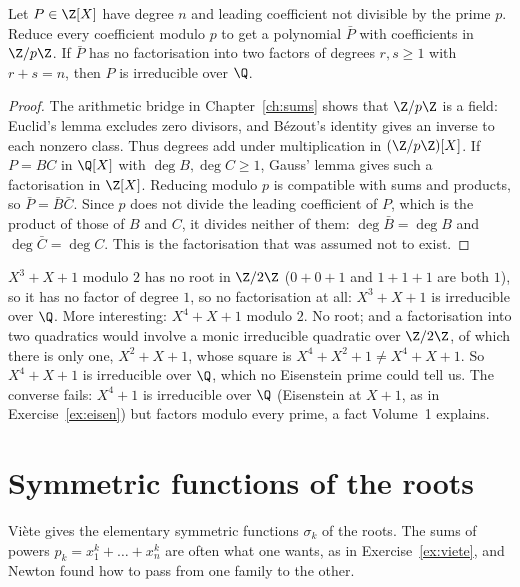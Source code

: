\begin{propositionx}
Let $P\in\Z[X]$ have degree $n$ and leading coefficient not divisible by the prime $p$. Reduce every coefficient modulo $p$ to get a polynomial
$\bar P$ with coefficients in $\Z/p\Z$. If $\bar P$ has no factorisation into two factors of degrees $r,s\ge1$ with $r+s=n$, then $P$ is
irreducible over $\Q$.
\end{propositionx}
\begin{proof}
The arithmetic bridge in Chapter~\ref{ch:sums} shows that $\Z/p\Z$ is a field: Euclid's lemma excludes zero divisors, and B\'ezout's identity gives an inverse to each nonzero class. Thus
degrees add under multiplication in $(\Z/p\Z)[X]$. If $P=BC$ in $\Q[X]$ with $\deg B,\deg C\ge1$, Gauss' lemma gives such a factorisation in $\Z[X]$.
Reducing modulo $p$ is compatible with sums and products, so $\bar P=\bar B\bar C$. Since $p$ does not divide the leading coefficient of $P$, which is
the product of those of $B$ and $C$, it divides neither of them: $\deg\bar B=\deg B$ and $\deg\bar C=\deg C$. This is the factorisation that was
assumed not to exist.
\end{proof}

\begin{examplex}
$X^3+X+1$ modulo $2$ has no root in $\Z/2\Z$ ($0+0+1$ and $1+1+1$ are both $1$), so it has no factor of degree $1$, so no factorisation at all:
$X^3+X+1$ is irreducible over $\Q$. More interesting: $X^4+X+1$ modulo $2$. No root; and a factorisation into two quadratics would involve a monic
irreducible quadratic over $\Z/2\Z$, of which there is only one, $X^2+X+1$, whose square is $X^4+X^2+1\ne X^4+X+1$. So $X^4+X+1$ is irreducible over
$\Q$, which no Eisenstein prime could tell us. The converse fails: $X^4+1$ is irreducible over $\Q$ (Eisenstein at $X+1$, as in
Exercise~\ref{ex:eisen}) but factors modulo every prime, a fact Volume~1 explains.
\end{examplex}

\section{Symmetric functions of the roots}\label{sec:symmetric}

Vi\`ete gives the elementary symmetric functions $\sigma_k$ of the roots. The sums of powers $p_k=x_1^k+\dots+x_n^k$ are often what one wants, as
in Exercise~\ref{ex:viete}, and Newton found how to pass from one family to the other.

